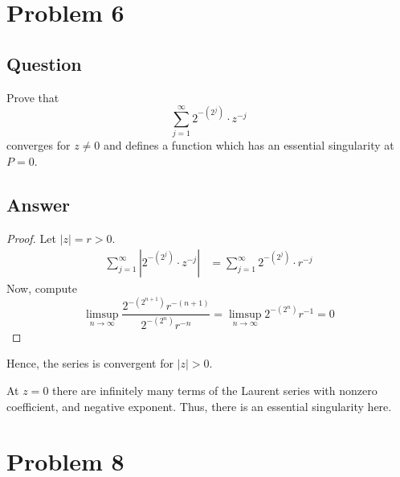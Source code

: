\documentclass[11pt]{article}
\begin{document}
\section{Problem 6}
\subsection{Question}
Prove that 
\[\sum_{j=1}^\infty 2^{-(2^j)}\cdot z^{-j}\]
converges for $z \neq 0$ and defines a function which has an essential singularity at $P=0$.
\subsection{Answer}
\begin{proof}
Let $|z|=r >0$. 
\begin{align*}\sum_{j=1}^\infty |2^{-(2^j)}\cdot z^{-j} |&= \sum_{j=1}^\infty 2^{-(2^j)}\cdot r^{-j}
 \end{align*}
 Now, compute
 \[\limsup_{n \to \infty} \frac{2^{-(2^{n+1})}r ^{-(n+1)}}{2^{-(2^n)} r^{-n}} = \limsup_{n \to \infty} 2^{-(2^n)}r^{-1}=0\]
\end{proof}
Hence, the series is convergent for $|z|>0$. 

At $z=0$ there are infinitely many terms of the Laurent series with nonzero coefficient, and negative exponent. Thus, there is an essential singularity here.

\section{Problem 8}
\end{document}
